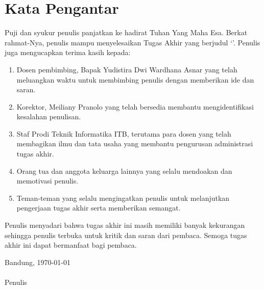 \chapter*{Kata Pengantar}

Puji dan syukur penulis panjatkan ke hadirat Tuhan Yang Maha Esa. Berkat rahmat-Nya, penulis mampu menyelesaikan Tugas Akhir yang berjudul ‘\thetitle’. Penulis juga mengucapkan terima kasih kepada:
\begin{enumerate}
	\item Dosen pembimbing, Bapak Yudistira Dwi Wardhana Asnar yang telah meluangkan waktu untuk membimbing penulis dengan memberikan ide dan saran.
	\item Korektor, Meiliany Pranolo yang telah bersedia membantu mengidentifikasi kesalahan penulisan.
	\item Staf Prodi Teknik Informatika ITB, terutama para dosen yang telah membagikan ilmu dan tata usaha yang membantu pengurusan administrasi tugas akhir. 
	\item Orang tua dan anggota keluarga lainnya yang selalu mendoakan dan memotivasi penulis.
	\item Teman-teman yang selalu mengingatkan penulis untuk melanjutkan pengerjaan tugas akhir serta memberikan semangat.
\end{enumerate}

Penulis menyadari bahwa tugas akhir ini masih memiliki banyak kekurangan sehingga penulis terbuka untuk kritik dan saran dari pembaca. Semoga tugas akhir ini dapat bermanfaat bagi pembaca.

\null\hfill Bandung, \today\\
\vspace{15pt}\\
\null\hfill Penulis